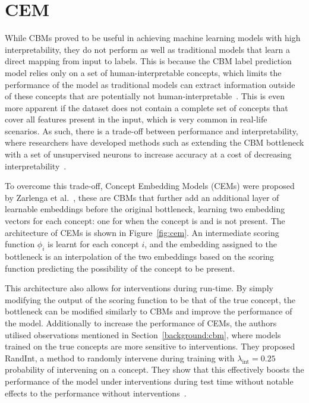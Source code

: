 \documentclass[../main.tex]{subfiles}
\begin{document}
\section{CEM}\label{background:cem}

While CBMs proved to be useful in achieving machine learning models with high
interpretability, they do not perform as well as traditional models that learn a direct
mapping from input to labels. This is because the CBM label
prediction model relies only on a set of human-interpretable concepts, which limits
the performance of the model as traditional models can extract
information outside of these concepts that are potentially not human-interpretable~\cite{cem}. 
This is even more apparent
if the dataset does not contain a complete set of concepts that cover all
features present in the input, which is very common in real-life scenarios.
As such, there is a trade-off between performance and interpretability, where researchers
have developed methods such as extending the CBM bottleneck with a set of unsupervised neurons
to increase accuracy at a cost of decreasing interpretability~\cite{cbm-hybrid}.

To overcome this trade-off, Concept Embedding Models (CEMs) were proposed by Zarlenga et al.~\cite{cem},
these are CBMs that further add an additional layer of learnable embeddings before
the original bottleneck, learning two embedding vectors for each concept: one for
when the concept is and is not present. The architecture of CEMs is shown in Figure~\ref{fig:cem}.
An intermediate scoring function $\phi_i$ is learnt for each concept $i$, 
and the embedding assigned to the bottleneck is an interpolation of the two embeddings
based on the scoring function predicting the possibility of the concept to be present.

This architecture also allows for interventions during run-time. By simply modifying the
output of the scoring function to be that of the true concept, the bottleneck 
can be modified similarly to CBMs and improve the performance of the model. Additionally
to increase the performance of CEMs, the authors utilised observations mentioned in
Section~\ref{background:cbm}, where models trained on the true concepts are more sensitive to 
interventions. They proposed RandInt, a method to randomly intervene
during training with $\lambda_{\text{int}} = 0.25$ probability of intervening
on a concept. They show that this effectively boosts the performance of the model 
under interventions during test time without notable effects to the performance 
without interventions~\cite{cem}.
\end{document}
